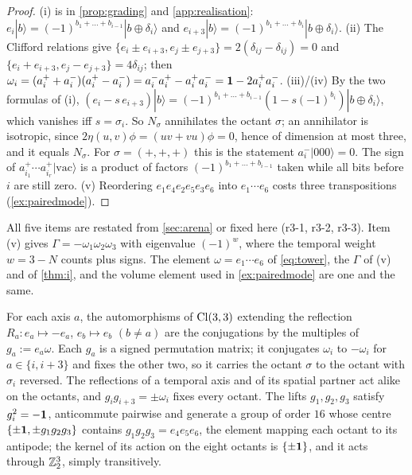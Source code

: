\begin{proof}
(i) is in \cref{prop:grading} and \cref{app:realisation}: $e_i|b\rangle=(-1)^{b_1+\dots+b_{i-1}}|b\oplus\delta_i\rangle$ and
$e_{i+3}|b\rangle=(-1)^{b_1+\dots+b_i}|b\oplus\delta_i\rangle$. (ii) The Clifford relations give $\{e_i\pm e_{i+3},e_j\pm e_{j+3}\}=2(\delta_{ij}-\delta_{ij})=0$
and $\{e_i+e_{i+3},e_j-e_{j+3}\}=4\delta_{ij}$; then $\omega_i=(a^+_i+a^-_i)(a^+_i-a^-_i)=a^-_ia^+_i-a^+_ia^-_i=\mathbf 1-2a^+_ia^-_i$. (iii)/(iv) By the two
formulas of (i), $(e_i-s\,e_{i+3})|b\rangle=(-1)^{b_1+\dots+b_{i-1}}(1-s(-1)^{b_i})|b\oplus\delta_i\rangle$, which vanishes iff $s=\sigma_i$. So $N_\sigma$
annihilates the octant $\sigma$; an annihilator is isotropic, since $2\eta(u,v)\phi=(uv+vu)\phi=0$, hence of dimension at most three, and it equals
$N_\sigma$. For $\sigma=(+,+,+)$ this is the statement $a^-_i|000\rangle=0$. The sign of $a^+_{i_1}\cdots a^+_{i_r}|\mathrm{vac}\rangle$ is a product of
factors $(-1)^{b_1+\dots+b_{i-1}}$ taken while all bits before $i$ are still zero. (v) Reordering $e_1e_4e_2e_5e_3e_6$ into $e_1\cdots e_6$
costs three transpositions (\cref{ex:pairedmode}).
\end{proof}

All five items are restated from \cref{sec:arena} or fixed here (r3-1, r3-2, r3-3). Item (v) gives $\Gamma=-\omega_1\omega_2\omega_3$ with eigenvalue $(-1)^w$, where the temporal weight $w=3-N$ counts plus signs. The element $\omega=e_1\cdots e_6$ of \eqref{eq:tower}, the $\Gamma$ of (v) and of \cref{thm:i}, and the volume element used in \cref{ex:pairedmode} are one and the same.

\begin{proposition}
\label{r3:prop:octgroup}
For each axis $a$, the automorphisms of $\mathrm{Cl}(3,3)$ extending the reflection $R_a:e_a\mapsto-e_a$, $e_b\mapsto e_b$ $(b\neq a)$ are the
conjugations by the multiples of $g_a:=e_a\omega$. Each $g_a$ is a signed permutation matrix; it conjugates $\omega_i$ to $-\omega_i$ for
$a\in\{i,i+3\}$ and fixes the other two, so it carries the octant $\sigma$ to the octant with $\sigma_i$ reversed. The reflections of a
temporal axis and of its spatial partner act alike on the octants, and $g_ig_{i+3}=\pm\omega_i$ fixes every octant. The lifts $g_1,g_2,g_3$
satisfy $g_i^2=-\mathbf 1$, anticommute pairwise and generate a group of order $16$ whose centre $\{\pm\mathbf 1,\pm g_1g_2g_3\}$ contains
$g_1g_2g_3=e_4e_5e_6$, the element mapping each octant to its antipode; the kernel of its action on the eight octants is $\{\pm\mathbf 1\}$, and
it acts through $\mathbb{Z}_2^3$, simply transitively.
\end{proposition}

